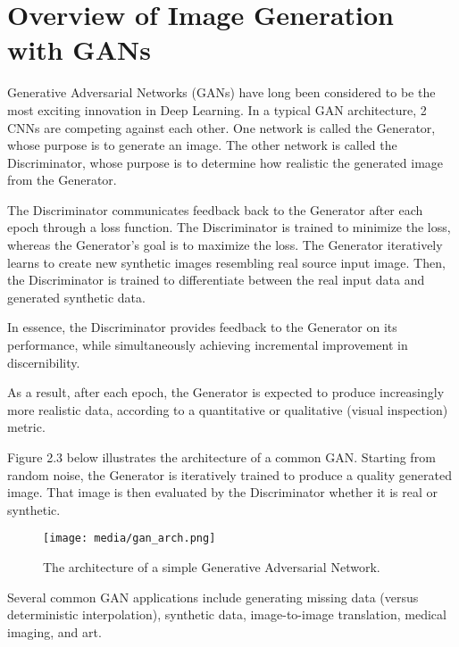 \section{Overview of Image Generation with GANs}

Generative Adversarial Networks (GANs) have long been considered to be 
the most exciting innovation in Deep Learning. In a typical GAN architecture, 
2 CNNs are competing against each other. One network is called the Generator, whose purpose is to 
generate an image. The other network is called the Discriminator, whose purpose is to determine 
how realistic the generated image from the Generator. 

The Discriminator communicates feedback back to the Generator after each epoch through a loss function.
The Discriminator is trained to minimize the loss, whereas the Generator's goal is to maximize the loss. 
The Generator iteratively learns to create new synthetic images resembling real source input image.
Then, the Discriminator is trained to differentiate between the real input data and generated synthetic data. \citep{GANs} 


In essence, the Discriminator provides feedback to the Generator on its performance, while 
simultaneously achieving incremental improvement in discernibility. 

As a result, after each epoch, the Generator is expected to produce increasingly more realistic data,
according to a quantitative or qualitative (visual inspection) metric.

\vspace{5mm}

Figure 2.3 below illustrates the architecture of a common GAN. Starting from random noise,
the Generator is iteratively trained to produce a quality generated image.
That image is then evaluated by the Discriminator whether it is real or synthetic.

\begin{figure}[H]
	\begin{center}
	\texttt{[image: media/gan\_arch.png]}
	\end{center}
	\caption[GAN Architecture]{The architecture of a simple
    Generative Adversarial Network. \citep{GANs}}
	\end{figure}

Several common GAN applications include generating missing data (versus deterministic
interpolation), synthetic data, image-to-image translation, medical imaging, and art.


